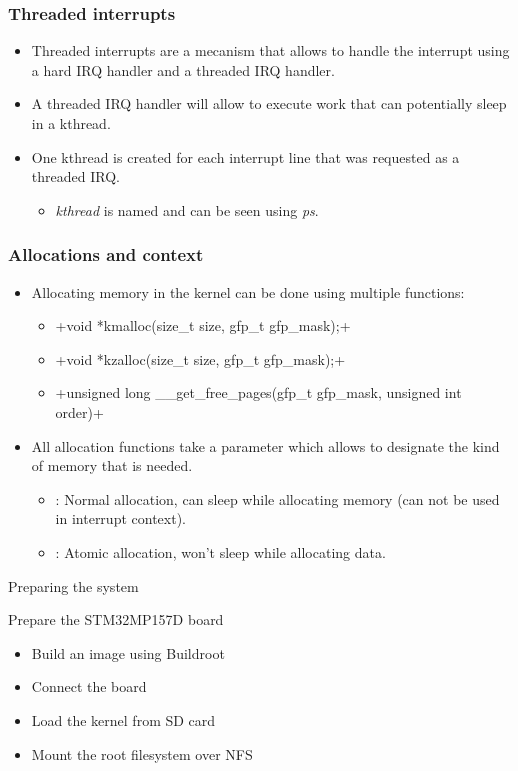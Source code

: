 \begin{frame}
  \frametitle{Threaded interrupts}
  \begin{itemize}
    \item Threaded interrupts are a mecanism that allows to handle the interrupt
          using a hard IRQ handler and a threaded IRQ handler.
    \item A threaded IRQ handler will allow to execute work that can potentially
          sleep in a kthread.
    \item One kthread is created for each interrupt line that was requested as
          a threaded IRQ.
    \begin{itemize}
      \item {\em kthread} is named  and can be seen using {\em ps}.
    \end{itemize}
  \end{itemize}
\end{frame}

\begin{frame}
  \frametitle{Allocations and context}
  \begin{itemize}
    \item Allocating memory in the kernel can be done using multiple functions:
    \begin{itemize}
      \item {}+void *kmalloc(size_t size, gfp_t gfp_mask);+
      \item {}+void *kzalloc(size_t size, gfp_t gfp_mask);+
      \item {}+unsigned long __get_free_pages(gfp_t gfp_mask, unsigned int order)+
    \end{itemize}
    \item All allocation functions take a  parameter which allows to
          designate the kind of memory that is needed.
    \begin{itemize}
      \item {}: Normal allocation, can sleep while allocating
            memory (can not be used in interrupt context).
      \item {}: Atomic allocation, won't sleep while allocating
            data.
    \end{itemize}
  \end{itemize}
\end{frame}

\setuplabframe
{Preparing the system}
{
  Prepare the STM32MP157D board
  \begin{itemize}
    \item Build an image using Buildroot
    \item Connect the board
    \item Load the kernel from SD card
    \item Mount the root filesystem over NFS
  \end{itemize}
}
